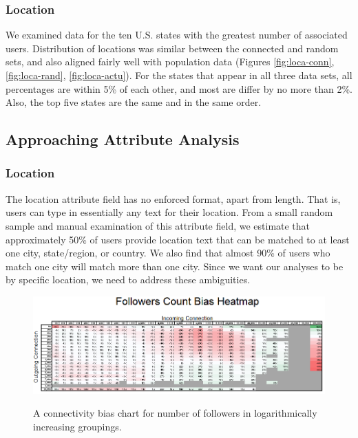 \subsubsection{Location}

We examined data for the ten U.S. states with the greatest number of associated users.  Distribution of locations was similar between the connected and random sets, and also aligned fairly well with population data (Figures \ref{fig:loca-conn}, \ref{fig:loca-rand}, \ref{fig:loca-actu}).  For the states that appear in all three data sets, all percentages are within 5\% of each other, and most are differ by no more than 2\%.  Also, the top five states are the same and in the same order.

\subsection{Approaching Attribute Analysis}

\subsubsection{Location}

The location attribute field has no enforced format, apart from length.  That is, users can type in essentially any text for their location.  From a small random sample and manual examination of this attribute field, we estimate that approximately 50\% of users provide location text that can be matched to at least one city, state/region, or country.  We also find that almost 90\% of users who match one city will match more than one city.  Since we want our analyses to be by specific location, we need to address these ambiguities.

\begin{figure}[t]
 \centering
 \includegraphics[bb=0 0 664 222,scale=.62]{./images/followers_count.png}
 \label{fig:follower_count}
 \caption{A connectivity bias chart for number of followers in logarithmically increasing groupings.}
\end{figure}

